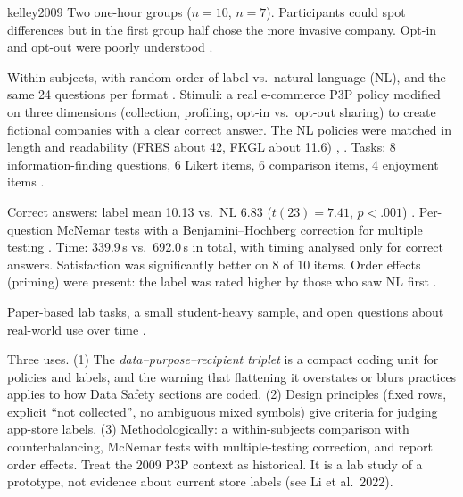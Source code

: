 \begin{papercard}{kelley2009}
 Two one-hour groups ($n=10$, $n=7$). Participants could spot differences but in the first group half chose the more invasive company. Opt-in and opt-out were poorly understood .

 Within subjects, with random order of label vs.\ natural language (NL), and the same 24 questions per format . Stimuli: a real e-commerce P3P policy modified on three dimensions (collection, profiling, opt-in vs.\ opt-out sharing) to create fictional companies with a clear correct answer. The NL policies were matched in length and readability (FRES about 42, FKGL about 11.6) , . Tasks: 8 information-finding questions, 6 Likert items, 6 comparison items, 4 enjoyment items .

 Correct answers: label mean 10.13 vs.\ NL 6.83 ($t(23)=7.41$, $p<.001$) . Per-question McNemar tests with a Benjamini--Hochberg correction for multiple testing . Time: 339.9\,s vs.\ 692.0\,s in total, with timing analysed only for correct answers. Satisfaction was significantly better on 8 of 10 items. Order effects (priming) were present: the label was rated higher by those who saw NL first .

 Paper-based lab tasks, a small student-heavy sample, and open questions about real-world use over time .

 Three uses. (1) The \emph{data--purpose--recipient triplet} is a compact coding unit for policies and labels, and the warning that flattening it overstates or blurs practices applies to how Data Safety sections are coded. (2) Design principles (fixed rows, explicit ``not collected'', no ambiguous mixed symbols) give criteria for judging app-store labels. (3) Methodologically: a within-subjects comparison with counterbalancing, McNemar tests with multiple-testing correction, and report order effects. Treat the 2009 P3P context as historical. It is a lab study of a prototype, not evidence about current store labels (see Li et al.\ 2022).
\end{papercard}
